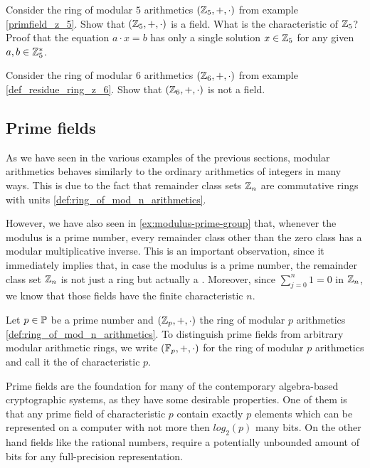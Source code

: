 \begin{exercise}
Consider the ring of modular $5$ arithmetics $(\mathbb{Z}_5,+,\cdot)$ from example \ref{primfield_z_5}. Show that $(\mathbb{Z}_5,+,\cdot)$ is a field. What is the characteristic of $\mathbb{Z}_5$? Proof that the equation $a\cdot x = b$ has only a single solution $x\in \mathbb{Z}_5$  for any given $a,b\in \mathbb{Z}_5^*$. 
\end{exercise}
\begin{exercise}
Consider the ring of modular $6$ arithmetics $(\mathbb{Z}_6,+,\cdot)$ from example \ref{def_residue_ring_z_6}. Show that $(\mathbb{Z}_6,+,\cdot)$ is not a field.
\end{exercise}

\subsection{Prime fields}
\label{prime_fields}
As we have seen in the various examples of the previous sections, modular arithmetics behaves similarly to the ordinary arithmetics of integers  in many ways. This is due to the fact that remainder class sets $\mathbb{Z}_n$ are commutative rings with units \ref{def:ring_of_mod_n_arithmetics}.

However, we have also seen in \ref{ex:modulus-prime-group} that, whenever the modulus is a prime number, every remainder class other than the zero class has a modular multiplicative inverse. This is an important observation, since it immediately implies that, in case the modulus is a prime number, the remainder class set $\mathbb{Z}_n$ is not just a ring but actually a . Moreover, since $\sum_{j=0}^n 1 = 0$ in $\mathbb{Z}_n$, we know that those fields have the finite characteristic $n$.

\begin{notation}
\label{def:prime_fields}
Let $p \in \mathbb{P}$ be a prime number and $(\mathbb{Z}_p,+,\cdot)$ the ring of modular $p$ arithmetics \ref{def:ring_of_mod_n_arithmetics}. To distinguish prime fields from arbitrary modular arithmetic rings, we write  $ (\mathbb{F}_p, +, \cdot) $ for the ring of modular $p$ arithmetics and call it the  of characteristic $p$.
\end{notation}

Prime fields are the foundation for many of the contemporary algebra-based cryptographic systems, as they have some desirable properties. One of them is that any prime field of characteristic $p$ contain exactly $p$ elements which can be represented on a computer with not more then $log_2(p)$ many bits. On the other hand fields like the rational numbers, require a potentially unbounded amount of bits for any full-precision representation.

